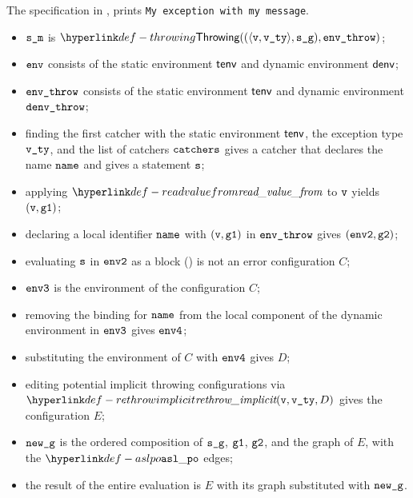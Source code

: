 The specification in , prints \texttt{My exception with my message}.

\ProseParagraph
\AllApply
\begin{itemize}
  \item $\texttt{s\_m}$ is $\Throwing((\langle \vv, \vvty \rangle, \sg), \envthrow)$;
  \item $\texttt{env}$ consists of the static environment $\textsf{tenv}$ and dynamic environment $\textsf{denv}$;
  \item $\texttt{env\_throw}$ consists of the static environment $\textsf{tenv}$ and dynamic environment \\ $\texttt{denv\_throw}$;
  \item finding the first catcher with the static environment $\textsf{tenv}$, the exception type $\texttt{v\_ty}$,
  and the list of catchers $\texttt{catchers}$ gives a catcher that declares the name $\texttt{name}$ and gives a statement $\texttt{s}$;
  \item applying $\readvaluefrom$ to $\texttt{v}$ yields $(\texttt{v}, \texttt{g1})$;
  \item declaring a local identifier $\texttt{name}$ with $(\texttt{v}, \texttt{g1})$ in $\texttt{env\_throw}$ gives $(\texttt{env2}, \texttt{g2})$;
  \item evaluating $\texttt{s}$ in $\texttt{env2}$ as a block () is not an error
        configuration $C$\ProseOrDynErrorDiverging;
  \item $\texttt{env3}$ is the environment of the configuration $C$;
  \item removing the binding for $\texttt{name}$ from the local component of the dynamic environment in $\texttt{env3}$
        gives $\texttt{env4}$;
  \item substituting the environment of $C$ with $\texttt{env4}$ gives $D$;
  \item editing potential implicit throwing configurations via $\rethrowimplicit(\vv, \vvty, D)$
        gives the configuration $E$;
  \item $\texttt{new\_g}$ is the ordered composition of $\texttt{s\_g}$, $\texttt{g1}$, $\texttt{g2}$, and the graph of $E$,
        with the $\aslpo$ edges;
  \item the result of the entire evaluation is $E$ with its graph substituted with $\texttt{new\_g}$.
\end{itemize}
\FormallyParagraph
